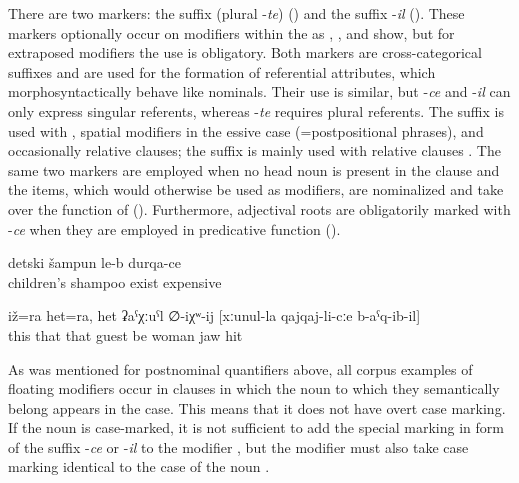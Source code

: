 There are two markers: the suffix  (plural -\textit{te}) () and the suffix -\textit{il} (). These markers optionally occur on modifiers within the  as , ,  and  show, but for extraposed modifiers the use is obligatory. Both markers are cross-categorical suffixes and are used for the formation of referential attributes, which morphosyntactically behave like nominals. Their use is similar, but -\textit{ce} and -\textit{il} can only express singular referents, whereas -\textit{te} requires plural referents. The suffix  is used with  , spatial modifiers in the essive case (=postpositional phrases), and occasionally relative clauses; the suffix  is mainly used with relative clauses . The same two markers are employed when no head noun is present in the clause and the items, which would otherwise be used as modifiers, are nominalized and take over the function of  (). Furthermore, adjectival roots are obligatorily marked with -\textit{ce} when they are employed in predicative function ().


\begin{exe}
		\ex	\label{ex:There is shampoo for children, expensive@19b}
		\gll	detski	šampun	le-b	durqa-ce\\
			children's	shampoo	exist	expensive\\
		\glt	{}

	\ex	\label{ex:‎This also and this also is probably the man who hit the woman on the jaw2}
	\gll	iž=ra	het=ra,	het	ʡaˁχːuˁl	∅-iχʷ-ij	[xːunul-la	qajqaj-li-cːe	b-aˁq-ib-il]\\
		this	that	that	guest	be	woman	jaw	hit\\
	\glt	{}
\end{exe}

As was mentioned for postnominal quantifiers above, all corpus examples of floating modifiers occur in clauses in which the noun to which they semantically belong appears in the  case. This means that it does not have overt case marking. If the noun is case-marked, it is not sufficient to add the special marking in form of the suffix -\textit{ce} or -\textit{il} to the modifier , but the modifier must also take case marking identical to the case of the noun .

